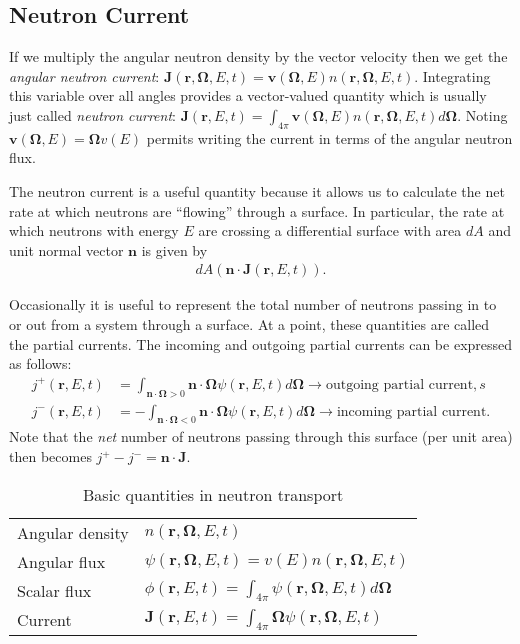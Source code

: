 \documentclass[11pt]{article}
\renewcommand\vec{\mathbf}
\begin{document}
\subsection{Neutron Current}
\label{sec:orgheadline3}
If we multiply the angular neutron density by the vector velocity then we get the \emph{angular neutron current}: \(\vec{J}(\vec{r},\vec{\Omega},E,t) = \vec{v}(\vec{\Omega},E) n(\vec{r},\vec{\Omega},E,t)\).  Integrating this variable over all angles provides a vector-valued quantity which is usually just called \emph{neutron current}: \(\vec{J}(\vec{r},E,t) = \int_{4\pi} \vec{v}(\vec{\Omega},E) n(\vec{r},\vec{\Omega},E,t) d\vec{\Omega}\).  Noting \(\vec{v}(\vec{\Omega},E) = \vec{\Omega}v(E)\) permits writing the current in terms of the angular neutron flux.

The neutron current is a useful quantity because it allows us to calculate the net rate at which neutrons are ``flowing'' through a surface.  In particular, the rate at which neutrons with energy \(E\) are crossing a differential surface with area \(dA\) and unit normal vector \(\vec{n}\) is given by
\begin{align}
  dA \left( \vec{n} \cdot \vec{J}(\vec{r},E,t) \right).
\end{align}

Occasionally it is useful to represent the total number of neutrons passing in to or out from a system through a surface.  At a point, these quantities are called the partial currents.  The incoming and outgoing partial currents can be expressed as follows:
\begin{align}
  j^+(\vec{r},E,t) &= \int_{\vec{n}\cdot\vec{\Omega}>0} \vec{n} \cdot \vec{\Omega} \psi(\vec{r},E,t) d\vec{\Omega} \rightarrow \text{outgoing partial current},s \\
  j^-(\vec{r},E,t) &= -\int_{\vec{n}\cdot\vec{\Omega}<0} \vec{n} \cdot \vec{\Omega} \psi(\vec{r},E,t) d\vec{\Omega} \rightarrow \text{incoming partial current}.
\end{align}
Note that the \emph{net} number of neutrons passing through this surface (per unit area) then becomes \(j^+ - j^- = \vec{n}\cdot\vec{J}\).

\begin{table}
  \centering
  \caption{Basic quantities in neutron transport}
  \begin{tabular}{ll}
  \hline
  Angular density & $n(\vec{r},\vec{\Omega},E,t)$ \\
  Angular flux & $\psi(\vec{r},\vec{\Omega},E,t) = v(E) n(\vec{r},\vec{\Omega},E,t)$ \\
  Scalar flux & $\phi(\vec{r},E,t) = \int_{4\pi} \psi(\vec{r},\vec{\Omega},E,t) d\vec{\Omega}$ \\
  Current & $\vec{J}(\vec{r},E,t) = \int_{4\pi} \vec{\Omega} \psi(\vec{r},\vec{\Omega},E,t)$ \\
  \hline
  \end{tabular}
\end{table}
\end{document}
